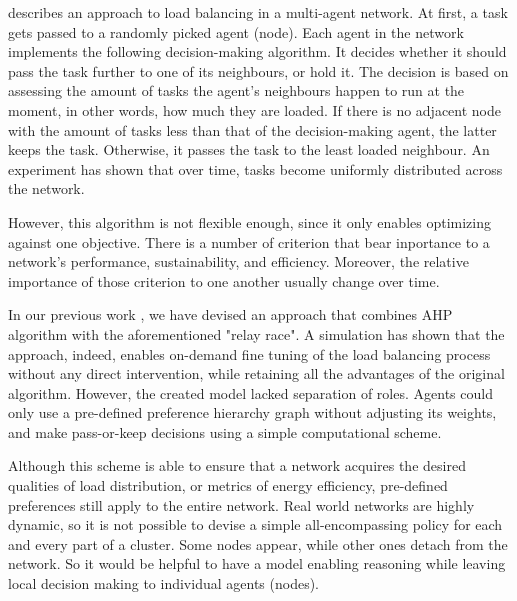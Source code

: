 \cite{gorodetskii-2012} describes an approach to load balancing in a multi-agent network.
At first, a task gets passed to a randomly picked agent (node).
Each agent in the network implements the following decision-making algorithm.
It decides whether it should pass the task further to one of its neighbours, or hold it.
The decision is based on assessing the amount of tasks the agent's neighbours happen to run at the moment, in other words, how much they are loaded.
If there is no adjacent node with the amount of tasks less than that of the decision-making agent, the latter keeps the task.
Otherwise, it passes the task to the least loaded neighbour.
An experiment has shown that over time, tasks become uniformly distributed across the network.

However, this algorithm is not flexible enough, since it only enables optimizing against one objective.
There is a number of criterion that bear inportance to a network's performance, sustainability, and efficiency.
Moreover, the relative importance of those criterion to one another usually change over time.

In our previous work \cite{murashov-2022}, we have devised an approach that combines AHP algorithm with the aforementioned "relay race".
A simulation has shown that the approach, indeed, enables on-demand fine tuning of the load balancing process without any direct intervention, while retaining all the advantages of the original algorithm.
However, the created model lacked separation of roles.
Agents could only use a pre-defined preference hierarchy graph without adjusting its weights, and make pass-or-keep decisions using a simple computational scheme.

Although this scheme is able to ensure that a network acquires the desired qualities of load distribution, or metrics of energy efficiency, pre-defined preferences still apply to the entire network.
Real world networks are highly dynamic, so it is not possible to devise a simple all-encompassing policy for each and every part of a cluster.
Some nodes appear, while other ones detach from the network.
So it would be helpful to have a model enabling reasoning while leaving local decision making to individual agents (nodes).
